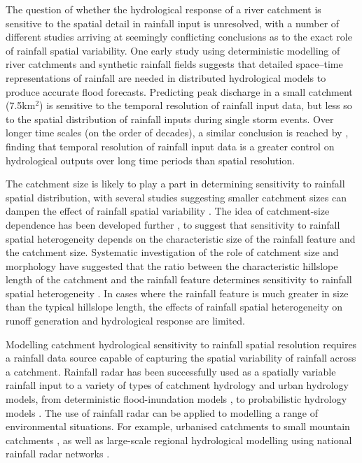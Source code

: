 The question of whether the hydrological response of a river catchment is sensitive to the spatial detail in rainfall input  is unresolved, with a number of different studies arriving at seemingly conflicting conclusions as to the exact role of rainfall spatial variability. One early study using deterministic modelling of river catchments and synthetic rainfall fields \citep{wilson1979influence} suggests that detailed space--time representations of rainfall are needed in distributed hydrological models to produce accurate flood forecasts. Predicting peak discharge in a small catchment (7.5km\(^2\)) is sensitive to the temporal resolution of rainfall input data, but less so to the spatial distribution of rainfall inputs during single storm events\citep{krajewski1991monte}. Over longer time scales (on the order of decades), a similar conclusion is reached by \citet{coulthard2016sensitivity}, finding that temporal resolution of rainfall input data is a greater control on hydrological outputs over long time periods than spatial resolution. 

The catchment size is likely to play a part in determining sensitivity to rainfall spatial distribution, with several studies suggesting smaller catchment sizes can dampen the effect of rainfall spatial variability \citep{segond2007simulation,nicotina2008impact}. The idea of catchment-size dependence has been developed further \citep{gabellani2007propagation}, to suggest that sensitivity to rainfall spatial heterogeneity depends on the characteristic size of the rainfall feature and the catchment size. Systematic investigation of the role of catchment size and morphology have suggested that the ratio between the characteristic hillslope length of the catchment and the rainfall feature determines sensitivity to rainfall spatial heterogeneity \citep{nicotina2008impact}. In cases where the rainfall feature is much greater in size than the typical hillslope length, the effects of rainfall spatial heterogeneity on runoff generation and hydrological response are limited. 

Modelling catchment hydrological sensitivity to rainfall spatial resolution requires a rainfall data source capable of capturing the spatial variability of rainfall across a catchment. Rainfall radar has been successfully used as a spatially variable rainfall input to a variety of types of catchment hydrology and urban hydrology models, from deterministic flood-inundation models \citep[e.g][]{coulthard2016sensitivity}, to probabilistic hydrology models \citep{bell2000sensitivity,cole2008hydrological}. The use of rainfall radar can be applied to modelling a range of environmental situations. For example, urbanised catchments \citep{berne2004temporal,einfalt2004towards,thorndahl2014analyses} to small mountain catchments \citep{borga2000use}, as well as large-scale regional hydrological modelling using national rainfall radar networks \citep{knebl2005regional}.

